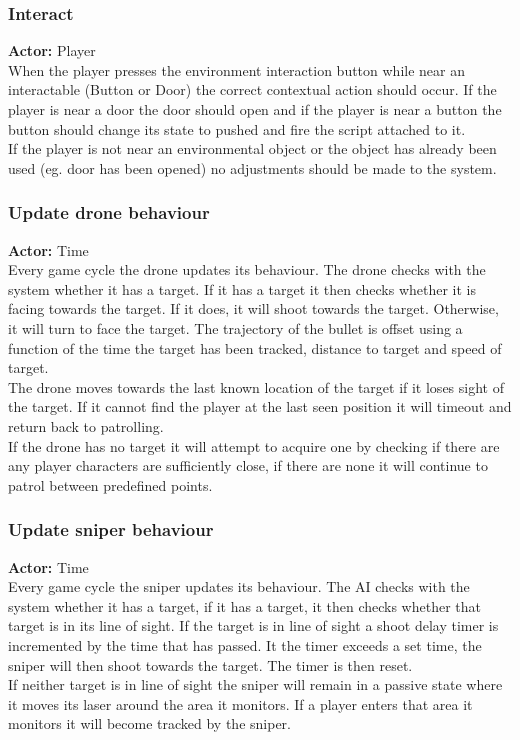 \documentclass[11pt,a4paper]{article}
\begin{document}
\subsubsection{Interact}
\textbf{Actor:} Player \smallskip \\
When the player presses the environment interaction button while near an interactable (Button or Door) the correct contextual action should occur. If the player is near a door the door should open and if the player is near a button the button should change its state to pushed and fire the script attached to it.\smallskip\\
If the player is not near an environmental object or the object has already been used (eg. door has been opened) no adjustments should be made to the system.

\subsubsection{Update drone behaviour}
\textbf{Actor:} Time\smallskip\\
Every game cycle the drone updates its behaviour. The drone checks with the system whether it has a target. If it has a target it then checks whether it is facing towards the target. If it does, it will shoot towards the target. Otherwise, it will turn to face the target. The trajectory of the bullet is offset using a function of the time the target has been tracked, distance to target and speed of target.\smallskip\\
The drone moves towards the last known location of the target if it loses sight of the target. If it cannot find the player at the last seen position it will timeout and return back to patrolling. \smallskip\\
If the drone has no target it will attempt to acquire one by checking if there are any player characters are sufficiently close, if there are none it will continue to patrol between predefined points.

\subsubsection{Update sniper behaviour}
\textbf{Actor:} Time\smallskip\\
Every game cycle the sniper updates its behaviour. The AI checks with the system whether it has a target, if it has a target, it then checks whether that target is in its line of sight. If the target is in line of sight a shoot delay timer is incremented by the time that has passed. It the timer exceeds a set time, the sniper will then shoot towards the target. The timer is then reset.\smallskip\\
If neither target is in line of sight the sniper will remain in a passive state where it moves its laser around the area it monitors. If a player enters that area it monitors it will become tracked by the sniper.
\end{document}
